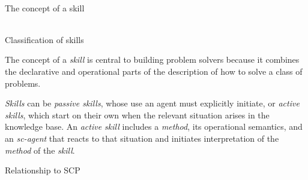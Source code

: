 \begin{frame}{\\The concept of a skill}
	\topline
	\justifying
        \begin{SCn}
        \end{SCn}
\end{frame}

\begin{frame}{\\Classification of skills}
	\topline
	\justifying
    \vspace{10mm}

The concept of a \textit{skill} is central to building problem solvers because it combines the declarative and operational parts of the description of how to solve a class of problems.

\textit{Skills} can be \textit{passive skills}, whose use an agent must explicitly initiate, or \textit{active skills}, which start on their own when the relevant situation arises in the knowledge base. An \textit{active skill} includes a \textit{method}, its operational semantics, and an \textit{sc-agent} that reacts to that situation and initiates interpretation of the \textit{method} of the \textit{skill}.
\end{frame}

\begin{frame}{Relationship to SCP}
    \topline
    \justifying

 \begin{SCn}


\end{SCn}

\end{frame}
